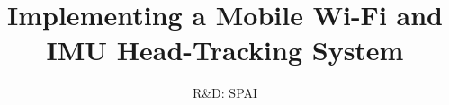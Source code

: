 \documentclass[11pt,a4paper,twocolumn]{report}
\title{Implementing a Mobile Wi-Fi and IMU Head-Tracking System}
\subtitle{R\&D: SPAI}
\begin{document}
	\preface
	
	
	
	
	
	
	
	


	\nocite{*}			%
	
	

   \appendix
    \appendixpage
	

%	

	\backcover
\end{document}
